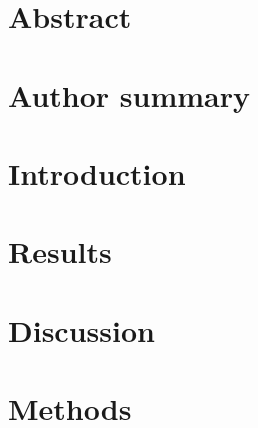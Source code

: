 \documentclass[10pt,letterpaper]{article}
\newcommand{\<}{\langle}
\renewcommand{\>}{\rangle}
\newcommand{\beginsupplement}{
\setcounter{table}{0}
\renewcommand{\thetable}{S\arabic{table}}%
\setcounter{figure}{0}
\renewcommand{\thefigure}{S\arabic{figure}}%
}
\begin{document}
\section*{Abstract}


\section*{Author summary}


\linenumbers

\section*{Introduction}




\section*{Results}










\section*{Discussion}




\section*{Methods}








\beginsupplement


\end{document}
